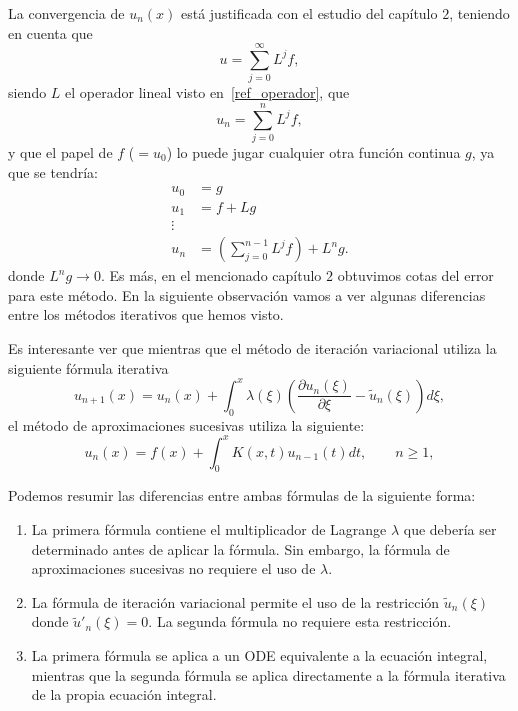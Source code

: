 La convergencia de $u_n(x)$ está justificada con el estudio del capítulo $2$, teniendo en cuenta que 
\begin{equation}
	u = \sum_{j=0}^{\infty}L^jf,
\end{equation}
siendo $L$ el operador lineal visto en~\eqref{ref_operador}, que 
\begin{equation}
	u_n = \sum_{j=0}^{n}L^jf,
\end{equation}
y que el papel de $f$ ($=u_0$) lo puede jugar cualquier otra función continua $g$, ya que se tendría:
\begin{align}
		u_0 &= g \\ u_1 &= f+Lg \\ \vdots \\ u_n &= (\sum_{j=0}^{n-1}L^jf)+L^ng.
\end{align}
donde $L^ng \rightarrow 0$. Es más, en el mencionado capítulo $2$ obtuvimos cotas del error para este método.
En la siguiente observación vamos a ver algunas diferencias entre los métodos iterativos que hemos visto.
\begin{observacion}
	Es interesante ver que mientras que el método de iteración variacional utiliza la siguiente fórmula iterativa
	\begin{equation}
		u_{n+1}(x) = u_n(x) + \int_{0}^{x} \lambda(\xi)(\dfrac{\partial u_n(\xi)}{\partial \xi}-\tilde{u}_n(\xi))d\xi,
	\end{equation}
	el método de aproximaciones sucesivas utiliza la siguiente:
	\begin{equation}
		u_n(x) = f(x) + \int_{0}^{x} K(x,t)u_{n-1}(t)dt, \qquad n \geqslant 1,
	\end{equation}
\end{observacion}
Podemos resumir las diferencias entre ambas fórmulas de la siguiente forma:
\begin{enumerate}
	\item La primera fórmula contiene el multiplicador de Lagrange $\lambda$ que debería ser determinado antes de aplicar la fórmula. Sin embargo, la fórmula de aproximaciones sucesivas no requiere el uso de $\lambda$.
	\item La fórmula de iteración variacional permite el uso de la restricción $\tilde{u}_n(\xi)$ donde $\tilde{u}'_n(\xi) = 0.$ La segunda fórmula no requiere esta restricción.
	\item La primera fórmula se aplica a un ODE equivalente a la ecuación integral, mientras que la segunda fórmula se aplica directamente a la fórmula iterativa de la propia ecuación integral.
\end{enumerate}

